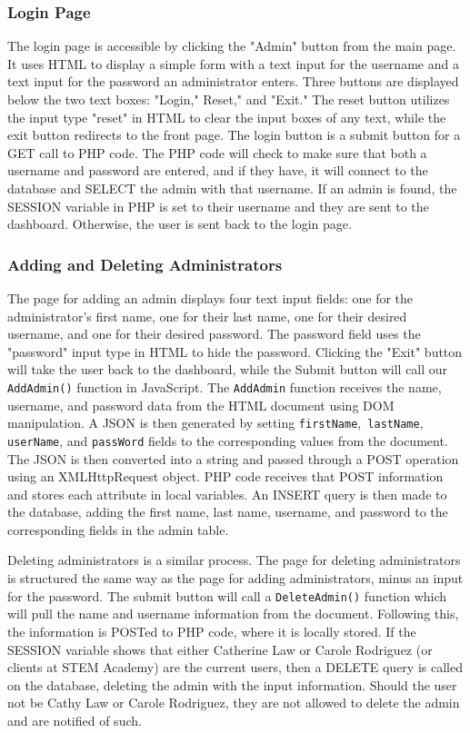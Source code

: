 \documentclass[letterpaper,10pt,serif,draftclsnofoot,onecolumn,compsoc,titlepage]{IEEEtran}
\begin{document}
\subsubsection{Login Page}
The login page is accessible by clicking the "Admin" button from the main page.
It uses HTML to display a simple form with a text input for the username and a text input for the password an administrator enters.
Three buttons are displayed below the two text boxes: "Login," Reset," and "Exit."
The reset button utilizes the input type "reset" in HTML to clear the input  boxes of any text, while the exit button redirects to the front page.
The login button is a submit button for a GET call to PHP code.
The PHP code will check to make sure that both a username and password are entered, and if they have, it will connect to the database and SELECT the admin with that username.
If an admin is found, the SESSION variable in PHP is set to their username and they are sent to the dashboard.
Otherwise, the user is sent back to the login page.
\subsubsection{Adding and Deleting Administrators}
The page for adding an admin displays four text input fields: one for the administrator's first name, one for their last name, one for their desired username, and one for their desired password.
The password field uses the "password" input type in HTML to hide the password.
Clicking the "Exit" button will take the user back to the dashboard, while the Submit button will call our \texttt{AddAdmin()} function in JavaScript.
The \texttt{AddAdmin} function receives the name, username, and password data from the HTML document using DOM manipulation.
A JSON is then generated by setting \texttt{firstName},\texttt{ lastName}, \texttt{userName}, and \texttt{passWord} fields to the corresponding values from the document.
The JSON is then converted into a string and passed through a POST operation using an XMLHttpRequest object.
PHP code receives that POST information and stores each attribute in local variables.
An INSERT query is then made to the database, adding the first name, last name, username, and password to the corresponding fields in the admin table.

Deleting administrators is a similar process.
The page for deleting administrators is structured the same way as the page for adding administrators, minus an input for the password.
The submit button will call a \texttt{DeleteAdmin()} function which will pull the name and username information from the document.
Following this, the information is POSTed to PHP code, where it is locally stored.
If the SESSION variable shows that either Catherine Law or Carole Rodriguez (or clients at STEM Academy) are the current users, then a DELETE query is called on the database, deleting the admin with the input information.
Should the user not be Cathy Law or Carole Rodriguez, they are not allowed to delete the admin and are notified of such.
\end{document}
